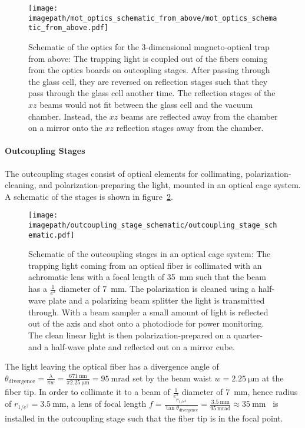 \begin{figure}
    \centering
    \texttt{[image: \\imagepath/mot\_optics\_schematic\_from\_above/mot\_optics\_schematic\_from\_above.pdf]}
    \caption{Schematic of the optics for the 3-dimensional magneto-optical trap from above: The trapping light is coupled out of the fibers coming from the optics boards on outcopling stages. After passing through the glass cell, they are reversed on reflection stages such that they pass through the glass cell another time. The reflection stages of the $xz$ beams would not fit between the glass cell and the vacuum chamber. Instead, the $xz$ beams are reflected away from the chamber on a mirror onto the $xz$ reflection stages away from the chamber.}
    \label{fig:mot_optics_schematic_from_above}
\end{figure}

\paragraph{Outcoupling Stages}
The outcoupling stages consist of optical elements for collimating, polarization-cleaning, and polarization-preparing the light, mounted in an optical cage system. A schematic of the stages is shown in figure~\ref{fig:outcoupling_stage_schematic}.

\begin{figure}
    \centering
    \texttt{[image: \\imagepath/outcoupling\_stage\_schematic/outcoupling\_stage\_schematic.pdf]}
    \caption{Schematic of the outcoupling stages in an optical cage system: The trapping light coming from an optical fiber is collimated with an achromatic lens with a focal length of \SI{35}{\milli\meter} such that the beam has a $\frac{1}{e^2}$ diameter of \SI{7}{\milli\meter}. The polarization is cleaned using a half-wave plate and a polarizing beam splitter the light is transmitted through. With a beam sampler a small amount of light is reflected out of the axis and shot onto a photodiode for power monitoring. The clean linear light is then polarization-prepared on a quarter- and a half-wave plate and reflected out on a mirror cube.}
    \label{fig:outcoupling_stage_schematic}
\end{figure}

The light leaving the optical fiber has a divergence angle of $\theta_\text{divergence} = \frac{\lambda}{\pi w} = \frac{\SI{671}{\nano\meter}}{\pi\SI{2.25}{\micro\meter}} = \SI{95}{\milli\radian}$ set by the beam waist $w = \SI{2.25}{\micro\meter}$ at the fiber tip. In order to collimate it to a beam of $\frac{1}{e^2}$ diameter of \SI{7}{\milli\meter}, hence radius of $r_{1/e^2} = \SI{3.5}{\milli\meter}$, a lens of focal length $f = \frac{r_{1/e^2}}{\tan \theta_\text{divergence}} = \frac{\SI{3.5}{\milli\meter}}{\SI{95}{\milli\radian}} \approx \SI{35}{\milli\meter}$~\cite{noauthor_collimated_2021} is installed in the outcoupling stage such that the fiber tip is in the focal point.

